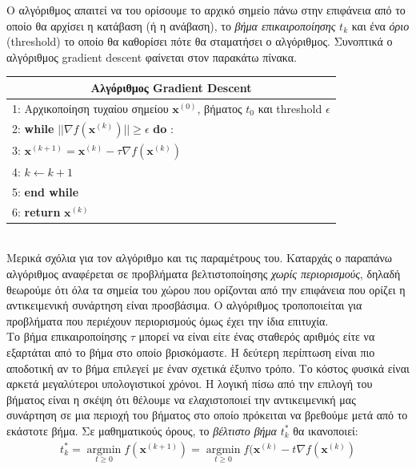 \documentclass[11pt]{article} %
\numberwithin{equation}{subsection}
\begin{document}
Ο αλγόριθμος απαιτεί να του ορίσουμε το αρχικό σημείο πάνω στην επιφάνεια από το οποίο θα αρχίσει η κατάβαση (ή η ανάβαση), το \textit{βήμα επικαιροποίησης} $t_k$ και ένα \textit{όριο} (threshold) το οποίο θα καθορίσει πότε θα σταματήσει ο αλγόριθμος. Συνοπτικά ο αλγόριθμος gradient descent φαίνεται στον παρακάτω πίνακα. \\


\begin{tabular}{ |p{13cm}}
 \hline
 \multicolumn{1}{|c|}{\textbf{Αλγόριθμος Gradient Descent}} \\
 \hline
1: Αρχικοποίηση τυχαίου σημείου $\textbf{x}^{(0)}$, βήματος $t_0$ και threshold $\epsilon$ \\
2: \textbf{while} $||\nabla f(\textbf{x}^{(k)})|| \geq \epsilon$ \textbf{do} :  \\
3: $\textbf{x}^{(k+1)} = \textbf{x}^{(k)} - \tau \nabla f(\textbf{x}^{(k)})$\\
4: $k \leftarrow k + 1$ \\
5: \textbf{end while}  \\
6: \textbf{return} $\textbf{x}^{(k)}$\\
\hline
\end{tabular}\\

Μερικά σχόλια για τον αλγόριθμο και τις παραμέτρους του. Καταρχάς ο παραπάνω αλγόριθμος αναφέρεται σε προβλήματα βελτιστοποίησης \textit{χωρίς περιορισμούς}, δηλαδή θεωρούμε ότι όλα τα σημεία του χώρου που ορίζονται από την επιφάνεια που ορίζει η αντικειμενική συνάρτηση είναι προσβάσιμα. Ο αλγόριθμος τροποποιείται για προβλήματα που περιέχουν περιορισμούς όμως έχει την ίδια επιτυχία.\\

Το βήμα επικαιροποίησης $\tau$  μπορεί να είναι είτε ένας σταθερός αριθμός είτε να εξαρτάται από το βήμα στο οποίο βρισκόμαστε. Η δεύτερη περίπτωση είναι πιο αποδοτική αν το βήμα επιλεγεί με έναν σχετικά έξυπνο τρόπο. Το κόστος φυσικά είναι αρκετά μεγαλύτεροι υπολογιστικοί χρόνοι. Η λογική πίσω από την επιλογή του βήματος είναι η σκέψη ότι θέλουμε να ελαχιστοποιεί την αντικειμενική μας συνάρτηση σε μια περιοχή του βήματος στο οποίο πρόκειται να βρεθούμε μετά από το εκάστοτε βήμα. Σε μαθηματικούς όρους, το \textit{βέλτιστο βήμα} $t_k ^ *$ θα ικανοποιεί:
\begin{align*}
t_k ^ * = \operatorname*{argmin}_{t \geq 0} f(\textbf{x}^{(k+1)}) = \operatorname*{argmin}_{t \geq 0} f(\textbf{x}^{(k)} - t \nabla f(\textbf{x}^{(k)})
\end{align*}
\end{document}
